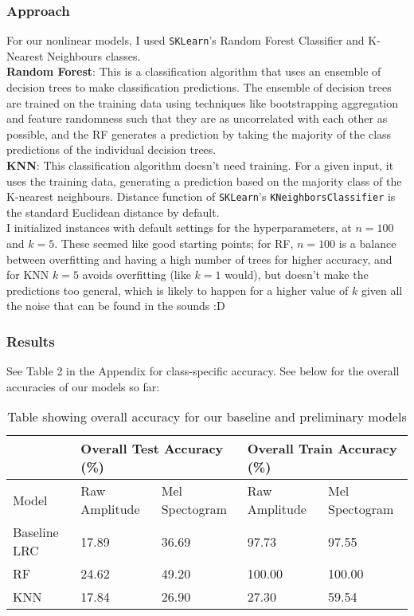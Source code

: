 \documentclass[11pt]{article}
\begin{document}
\subsubsection{Approach}

For our nonlinear models, I used \texttt{SKLearn}'s Random Forest Classifier and K-Nearest Neighbours classes.\\

\noindent \textbf{Random Forest}: This is a classification algorithm that uses an ensemble of decision trees to make classification predictions. The ensemble of decision trees are trained on the training data using techniques like bootstrapping aggregation and feature randomness such that they are as uncorrelated with each other as possible, and the RF generates a prediction by taking the majority of the class predictions of the individual decision trees.\\

\noindent \textbf{KNN}: This classification algorithm doesn't need training. For a given input, it uses the training data, generating a prediction based on the majority class of the K-nearest neighbours. Distance function of \texttt{SKLearn}'s \texttt{KNeighborsClassifier} is the standard Euclidean distance by default.\\

\noindent I initialized instances with default settings for the hyperparameters, at $n = 100$ and $k = 5$. These seemed like good starting points; for RF, $n = 100$ is a balance between overfitting and having a high number of trees for higher accuracy, and for KNN $k = 5$ avoids overfitting (like $k=1$ would), but doesn't make the predictions too general, which is likely to happen for a higher value of $k$ given all the noise that can be found in the sounds :D

\subsubsection{Results}
See Table 2 in the Appendix for class-specific accuracy. See below for the overall accuracies of our models so far:

\begin{table}[h!]
\centering
\begin{tabular}{lllll}
             & \multicolumn{2}{l}{Overall Test Accuracy (\%)} & \multicolumn{2}{l}{Overall Train Accuracy (\%)} \\ \toprule
Model        & Raw Amplitude         & Mel Spectogram         & Raw Amplitude          & Mel Spectogram         \\ \toprule
Baseline LRC & 17.89                 & 36.69                  & 97.73                  & 97.55                  \\
RF           & 24.62                 & 49.20                  & 100.00                 & 100.00                 \\
KNN          & 17.84                 & 26.90                  & 27.30                  & 59.54                 
\end{tabular}
\caption{\label{tab:1}Table showing overall accuracy for our baseline and preliminary models}
\end{table}
\end{document}
